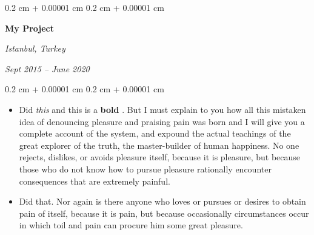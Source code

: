 \documentclass[10pt, letterpaper]{article}
\newenvironment{highlights}{
    \begin{itemize}[
        topsep=0.10 cm,
        parsep=0.10 cm,
        partopsep=0pt,
        itemsep=0pt,
        leftmargin=0.4 cm + 10pt
    ]
}{
    \end{itemize}
} %
\newenvironment{onecolentry}{
    \begin{adjustwidth}{
        0.2 cm + 0.00001 cm
    }{
        0.2 cm + 0.00001 cm
    }
}{
    \end{adjustwidth}
} %
\newenvironment{twocolentry}[2][]{
    \onecolentry
    \def\secondColumn{#2}
    \setcolumnwidth{\fill, 4.5 cm}
    \begin{paracol}{2}
}{
    \switchcolumn \raggedleft \secondColumn
    \end{paracol}
    \endonecolentry
} %
\let\hrefWithoutArrow\href
\renewcommand{\href}[2]{\hrefWithoutArrow{#1}{\ifthenelse{\equal{#2}{}}{ }{#2 }\raisebox{.15ex}{\footnotesize \faExternalLink*}}}
\begin{document}
        \begin{twocolentry}{
        \textit{Istanbul, Turkey}    
            
        \textit{Sept 2015 – June 2020}}
            \textbf{My Project}
        \end{twocolentry}
        \vspace{0.10 cm}
        \begin{onecolentry}
            \begin{highlights}
                \item Did \textit{this} and this is a \textbf{bold} \href{https://example.com}{link}. But I must explain to you how all this mistaken idea of denouncing pleasure and praising pain was born and I will give you a complete account of the system, and expound the actual teachings of the great explorer of the truth, the master-builder of human happiness. No one rejects, dislikes, or avoids pleasure itself, because it is pleasure, but because those who do not know how to pursue pleasure rationally encounter consequences that are extremely painful.
                \item Did that. Nor again is there anyone who loves or pursues or desires to obtain pain of itself, because it is pain, but because occasionally circumstances occur in which toil and pain can procure him some great pleasure.
            \end{highlights}
        \end{onecolentry}


        \vspace{0.2 cm}
\end{document}
